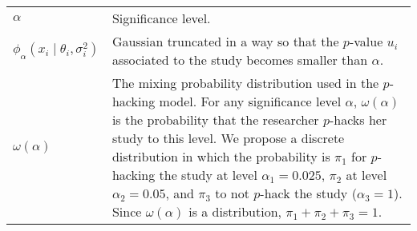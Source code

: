 \begin{table}[ht]
\begin{tabular}{l|p{13cm}}
    $\alpha$ & Significance level.\\
    $\phi_\alpha(x_{i}\mid\theta_{i},\sigma^2_{i})$ & Gaussian truncated in a way so that the $p$-value $u_i$ associated to the study becomes smaller than $\alpha$.\\
    $\omega(\alpha)$ & The mixing probability distribution used in the $p$-hacking model. For any significance level $\alpha$, $\omega(\alpha)$ is the probability that the researcher $p$-hacks her study to this level. We propose a discrete distribution in which the probability is $\pi_1$ for $p$-hacking the study at level $\alpha_1 = 0.025$, $\pi_2$ at level $\alpha_2 = 0.05$, and $\pi_3$ to not $p$-hack the study ($\alpha_3 = 1$). Since $\omega(\alpha)$ is a distribution,  $\pi_1 + \pi_2 + \pi_3 = 1$. \\
    \hline
    \end{tabular}
\end{table}